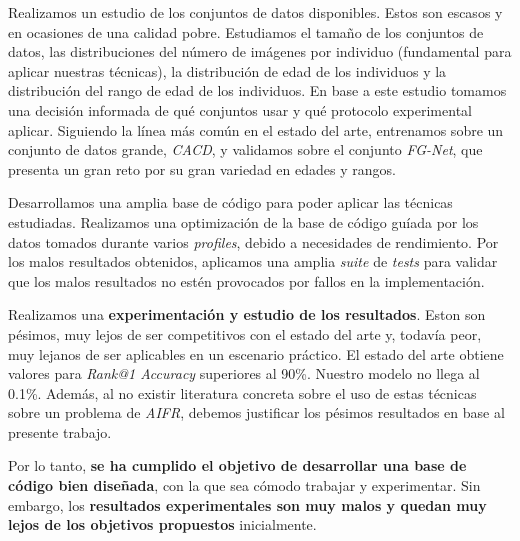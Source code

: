 Realizamos un estudio de los conjuntos de datos disponibles. Estos son escasos y en ocasiones de una calidad pobre. Estudiamos el tamaño de los conjuntos de datos, las distribuciones del número de imágenes por individuo (fundamental para aplicar nuestras técnicas), la distribución de edad de los individuos y la distribución del rango de edad de los individuos. En base a este estudio tomamos una decisión informada de qué conjuntos usar y qué protocolo experimental aplicar. Siguiendo la línea más común en el estado del arte, entrenamos sobre un conjunto de datos grande, \textit{CACD}, y validamos sobre el conjunto \textit{FG-Net}, que presenta un gran reto por su gran variedad en edades y rangos.

Desarrollamos una amplia base de código para poder aplicar las técnicas estudiadas. Realizamos una optimización de la base de código guíada por los datos tomados durante varios \textit{profiles}, debido a necesidades de rendimiento. Por los malos resultados obtenidos, aplicamos una amplia \textit{suite} de \textit{tests} para validar que los malos resultados no estén provocados por fallos en la implementación.

Realizamos una \textbf{experimentación y estudio de los resultados}. Eston son pésimos, muy lejos de ser competitivos con el estado del arte y, todavía peor, muy lejanos de ser aplicables en un escenario práctico. El estado del arte obtiene valores para \textit{Rank@1 Accuracy} superiores al 90\%. Nuestro modelo no llega al 0.1\%. Además, al no existir literatura concreta sobre el uso de estas técnicas sobre un problema de \textit{AIFR}, debemos justificar los pésimos resultados en base al presente trabajo.

Por lo tanto, \textbf{se ha cumplido el objetivo de desarrollar una base de código bien diseñada}, con la que sea cómodo trabajar y experimentar. Sin embargo, los \textbf{resultados experimentales son muy malos y quedan muy lejos de los objetivos propuestos} inicialmente.

\endinput
